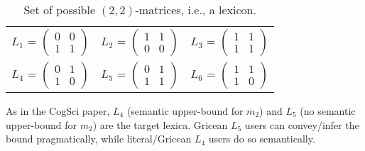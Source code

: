 \documentclass[a4paper]{article}
\begin{document}
\begin{table}[h]
\centering 
\begin{tabular}{l c l}
$L_1$ = $\begin{pmatrix} 0 & 0 \\ 1 & 1 \end{pmatrix}$ & 
$L_2$ = $\begin{pmatrix} 1 & 1 \\ 0 & 0 \end{pmatrix}$ & 
$L_3$ = $\begin{pmatrix} 1 & 1 \\ 1 & 1 \end{pmatrix}$\\[0.5cm]

$L_4$ = $\begin{pmatrix} 0 & 1 \\ 1 & 0 \end{pmatrix}$ &
$L_5$ = $\begin{pmatrix} 0 & 1 \\ 1 & 1 \end{pmatrix}$ &
$L_6$ = $\begin{pmatrix} 1 & 1 \\ 1 & 0 \end{pmatrix}$
\end{tabular}
\caption{{\footnotesize Set of possible $(2,2)$-matrices, i.e., a lexicon.}}
\label{tab:lexica}
\end{table}

As in the CogSci paper, $L_4$ (semantic upper-bound for $m_2$) and $L_5$ (no semantic upper-bound for $m_2$) are the target lexica. Gricean $L_5$ users can convey/infer the bound pragmatically, while literal/Gricean $L_4$ users do so semantically.
\end{document}
